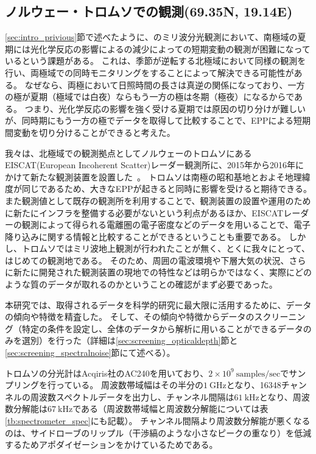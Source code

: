 \subsection{ノルウェー・トロムソでの観測(69.35\textdegree N, 19.14\textdegree E)}
\label{ssec:obs_tromsoe}
\ref{sec:intro_privious}節で述べたように、のミリ波分光観測において、南極域の夏期には光化学反応の影響によるの減少によっての短期変動の観測が困難になっているという課題がある。
これは、季節が逆転する北極域において同様の観測を行い、両極域での同時モニタリングをすることによって解決できる可能性がある。
なぜなら、両極において日照時間の長さは真逆の関係になっており、一方の極が夏期（極域では白夜）ならもう一方の極は冬期（極夜）になるからである。
つまり、光化学反応の影響を強く受ける夏期では原因の切り分けが難しいが、同時期にもう一方の極でデータを取得して比較することで、EPPによる短期間変動を切り分けることができると考えた。\par

我々は、北極域での観測拠点としてノルウェーのトロムソにあるEISCAT(European Incoherent Scatter)レーダー観測所に、2015年から2016年にかけて新たな観測装置を設置した~\cite{ito2017master}。
トロムソは南極の昭和基地とおよそ地理緯度が同じであるため、大きなEPPが起きると同時に影響を受けると期待できる。
また観測値として既存の観測所を利用することで、観測装置の設置や運用のために新たにインフラを整備する必要がないという利点があるほか、EISCATレーダーの観測によって得られる電離圏の電子密度などのデータを用いることで、電子降り込みに関する情報と比較することができるということも重要である。
しかし、トロムソではミリ波地上観測が行われたことが無く、とくに我々にとって、はじめての観測地である。
そのため、周囲の電波環境や下層大気の状況、さらに新たに開発された観測装置の現地での特性などは明らかではなく、実際にどのような質のデータが取れるのかということの確認がまず必要であった。\par

本研究では、取得されるデータを科学的研究に最大限に活用するために、データの傾向や特徴を精査した。
そして、その傾向や特徴からデータのスクリーニング（特定の条件を設定し、全体のデータから解析に用いることができるデータのみを選別）を行った（詳細は\ref{sec:screening_opticaldepth}節と\ref{sec:screening_spectralnoise}節にて述べる）。\par

トロムソの分光計はAcqiris社のAC240を用いており、$2\times 10^9\ \mathrm{samples/sec}$でサンプリングを行っている。
周波数帯域幅はその半分の$1\ \mathrm{GHz}$となり、16348チャンネルの周波数スペクトルデータを出力し、チャンネル間隔は$61\ \mathrm{kHz}$となり、周波数分解能は$67\ \mathrm{kHz}$である（周波数帯域幅と周波数分解能については表\ref{tb:spectrometer_spec}にも記載）。
チャンネル間隔より周波数分解能が悪くなるのは、サイドローブのリップル（干渉縞のような小さなピークの重なり）を低減するためアポダイゼーションをかけているためである。


